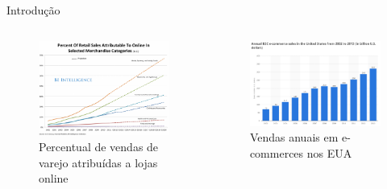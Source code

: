\begin{frame}{Introdução}
\begin{columns}[c] %


\begin{figure}[ht]
    \begin{center}
    \includegraphics[width=1\textwidth]{img/crescimento-ecommerce}\caption{Percentual de vendas de varejo atribuídas a lojas online \cite{crescimento-ecommerce}}
    \end{center}
\end{figure}

\begin{figure}[ht]
    \begin{center}
    \includegraphics[width=1\textwidth]{img/sales-ecommerce}\caption{Vendas anuais em e-commerces nos EUA \cite{sales-ecommerce}}
    \end{center}
\end{figure}

\end{columns}

\end{frame}

